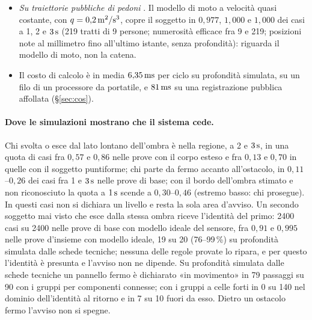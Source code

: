 \begin{itemize}
\item \emph{Su traiettorie pubbliche di pedoni} . Il modello di moto a velocità quasi costante, con $q=0{,}2\,\mathrm{m^2/s^3}$, copre il soggetto in $0{,}977$, $1{,}000$ e $1{,}000$ dei casi a 1, 2 e $3\,\mathrm{s}$ (219 tratti di 9 persone; numerosità efficace fra 9 e 219; posizioni note al millimetro fino all'ultimo istante, senza profondità): riguarda il modello di moto, non la catena.
\item Il costo di calcolo è in media $6{,}35\,\mathrm{ms}$ per ciclo su profondità simulata, su un filo di un processore da portatile, e $81\,\mathrm{ms}$ su una registrazione pubblica affollata (\S\ref{sec:cos}).
\end{itemize}

\paragraph{Dove le simulazioni mostrano che il sistema cede.} Chi svolta o esce dal lato lontano dell'ombra è nella regione, a 2 e $3\,\mathrm{s}$, in una quota di casi fra $0{,}57$ e $0{,}86$ nelle prove con il corpo esteso e fra $0{,}13$ e $0{,}70$ in quelle con il soggetto puntiforme; chi parte da fermo accanto all'ostacolo, in $0{,}11$--$0{,}26$ dei casi fra 1 e $3\,\mathrm{s}$ nelle prove di base; con il bordo dell'ombra stimato e non riconosciuto la quota a $1\,\mathrm{s}$ scende a $0{,}30$--$0{,}46$ (estremo basso: chi prosegue). In questi casi non si dichiara un livello e resta la sola area d'avviso. Un secondo soggetto mai visto che esce dalla stessa ombra riceve l'identità del primo: 2400 casi su 2400 nelle prove di base con modello ideale del sensore, fra $0{,}91$ e $0{,}995$ nelle prove d'insieme con modello ideale, 19 su 20 (76--99\,\%) su profondità simulata dalle schede tecniche; nessuna delle regole provate lo ripara, e per questo l'identità è presunta e l'avviso non ne dipende. Su profondità simulata dalle schede tecniche un pannello fermo è dichiarato «in movimento» in 79 passaggi su 90 con i gruppi per componenti connesse; con i gruppi a celle forti in 0 su 140 nel dominio dell'identità al ritorno e in 7 su 10 fuori da esso. Dietro un ostacolo fermo l'avviso non si spegne.

